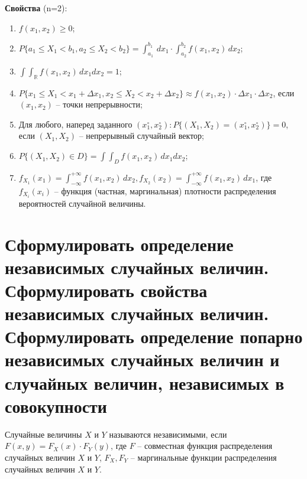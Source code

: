 \textbf{Свойства} (n=2):
\begin{enumerate}
	\item $f(x_1, x_2) \geq 0$;
	\item $P\{a_1 \leq X_1 < b_1, a_2 \leq X_2 < b_2\} = \int_{a_1}^{b_1} \, dx_1 \cdot \int_{a_2}^{b_2} f(x_1, x_2)\, dx_2$;
	\item $\int \int_{\mathbb{R}} f(x_1, x_2)\, dx_1dx_2 = 1$;
	\item $P\{x_1 \leq X_1 < x_1 + \Delta x_1, x_2 \leq X_2 < x_2 + \Delta x_2\} \approx f(x_1, x_2) \cdot \Delta x_1 \cdot \Delta x_2$, если $(x_1, x_2)$ -- точки непрерывности;
	\item Для любого, наперед заданного $(x_1^\circ, x_2^\circ): P\{(X_1, X_2) = (x_1^\circ, x_2^\circ)\} = 0$, если $(X_1, X_2)$ -- непрерывный случайный вектор;
	\item $P\{(X_1, X_2) \in D\} = \int \int_D f(x_1, x_2) \, dx_1dx_2$;
	\item $f_{X_1} (x_1) = \int_{- \infty}^{+\infty} f(x_1, x_2) \, dx_2, f_{X_2} (x_2) = \int_{- \infty}^{+\infty} f(x_1, x_2) \, dx_1$, где $f_{X_i}(x_i)$ -- функция (частная, маргинальная) плотности распределения вероятностей случайной величины.
\end{enumerate}


\section{Сформулировать определение независимых случайных величин. Сформулировать свойства независимых случайных величин. Сформулировать определение попарно независимых случайных величин и случайных величин, независимых в совокупности}

Случайные величины $X$ и $Y$ называются независимыми, если $F(x, y) = F_X(x) \cdot F_Y(y)$, где $F$ -- совместная функция распределения случайных величин $X$ и $Y$, $F_X, F_Y$ -- маргинальные функции распределения случайных величин $X$ и $Y$.

